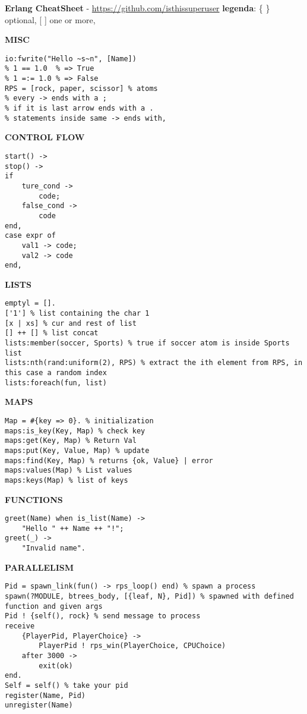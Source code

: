 \documentclass{article}
\begin{document}
\textbf{Erlang CheatSheet} - \href{https://github.com/isthissuperuser}{https://github.com/isthissuperuser} \textbar{ }  \textbf{legenda}: \{ \} optional, [ ] one or more, 
\begin{multicols*}{3}

\hrulefill

\textbf{MISC}
\begin{lstlisting}
io:fwrite("Hello ~s~n", [Name])
% 1 == 1.0  % => True
% 1 =:= 1.0 % => False
RPS = [rock, paper, scissor] % atoms
% every -> ends with a ;
% if it is last arrow ends with a .
% statements inside same -> ends with,
\end{lstlisting}

\hrulefill

\textbf{CONTROL FLOW}
\begin{lstlisting}
start() ->
stop() ->
if
    ture_cond ->
        code;
    false_cond ->
        code
end,
case expr of
    val1 -> code;
    val2 -> code
end,
\end{lstlisting}

\hrulefill

\textbf{LISTS}
\begin{lstlisting}
emptyl = [].
['1'] % list containing the char 1
[x | xs] % cur and rest of list
[] ++ [] % list concat 
lists:member(soccer, Sports) % true if soccer atom is inside Sports list
lists:nth(rand:uniform(2), RPS) % extract the ith element from RPS, in this case a random index
lists:foreach(fun, list)
\end{lstlisting}

\hrulefill

\textbf{MAPS}
\begin{lstlisting}
Map = #{key => 0}. % initialization
maps:is_key(Key, Map) % check key
maps:get(Key, Map) % Return Val
maps:put(Key, Value, Map) % update
maps:find(Key, Map) % returns {ok, Value} | error
maps:values(Map) % List values 
maps:keys(Map) % list of keys
\end{lstlisting}

\hrulefill

\textbf{FUNCTIONS}
\begin{lstlisting}
greet(Name) when is_list(Name) ->
    "Hello " ++ Name ++ "!";
greet(_) ->
    "Invalid name".
\end{lstlisting}

\hrulefill

\textbf{PARALLELISM}
\begin{lstlisting}
Pid = spawn_link(fun() -> rps_loop() end) % spawn a process
spawn(?MODULE, btrees_body, [{leaf, N}, Pid]) % spawned with defined function and given args
Pid ! {self(), rock} % send message to process
receive
    {PlayerPid, PlayerChoice} ->
        PlayerPid ! rps_win(PlayerChoice, CPUChoice)
    after 3000 ->
        exit(ok)
end.
Self = self() % take your pid
register(Name, Pid)
unregister(Name)
\end{lstlisting}


\end{multicols*}
\end{document}
